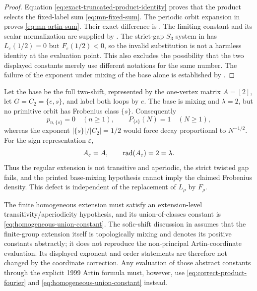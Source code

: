 \begin{proof}
Equation \eqref{eq:exact-truncated-product-identity} proves that the product
selects the fixed-label sum \eqref{eq:mn-fixed-sum}.  The periodic orbit
expansion in  proves
\eqref{eq:mn-artin-sum}.  Their exact difference is
.  The limiting constant and its
scalar normalization are supplied by .  The
strict-gap \(S_3\) system in  has
\(L_\varepsilon(1/2)=0\) but \(F_\varepsilon(1/2)<0\), so the invalid
  substitution is not a harmless identity at the evaluation point.  This also
  excludes the possibility that the two displayed constants merely use
  different notations for the same number.  The failure of the exponent under
  mixing of the base alone is established by
  .
\end{proof}

\begin{remark}
\label{rem:trivial-cocycle-counterexample}
Let the base be the full two-shift, represented by the one-vertex matrix
\(A=[2]\), let \(G=C_2=\{e,s\}\), and label both loops by \(e\).  The base is
mixing and \(\lambda=2\), but no primitive orbit has Frobenius class \(\{s\}\).
Consequently
\[
 p_{n,\{s\}}=0\quad(n\ge1),
 \qquad P_{\{s\}}(N)=1\quad(N\ge1),
\]
whereas the exponent \(|\{s\}|/|C_2|=1/2\) would force decay proportional to
\(N^{-1/2}\).  For the sign representation \(\varepsilon\),
\[
 A_\varepsilon=A,
 \qquad \operatorname{rad}(A_\varepsilon)=2=\lambda.
\]
Thus the regular extension is not transitive and aperiodic, the strict
twisted gap fails, and the printed base-mixing hypothesis cannot imply the
claimed Frobenius density.  This defect is independent of the replacement
of \(L_\rho\) by \(F_\rho\).
\end{remark}

\begin{remark}
\label{rem:post-1999-scope}
The finite homogeneous extension must satisfy an extension-level
transitivity/aperiodicity hypothesis, and its union-of-classes constant is
\eqref{eq:homogeneous-union-constant}.  The sofic-shift discussion in
\cite[Sec.~4.3]{NordinNooraniMohd2024OrbitGrowthSoficPFT} assumes that the
finite-group extension itself is topologically mixing and denotes its
positive constants abstractly; it does not reproduce the non-principal
Artin-coordinate evaluation.  Its displayed exponent and order statements
are therefore not changed by the coordinate correction.  Any evaluation of
those abstract constants through the explicit 1999 Artin formula must,
however, use \eqref{eq:correct-product-fourier} and
\eqref{eq:homogeneous-union-constant} instead.
\end{remark}

